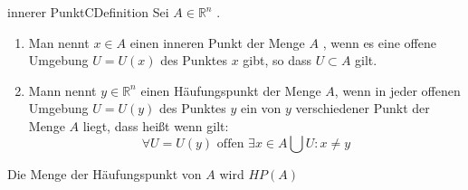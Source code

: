 \documentclass[11.5 pt, a4paper]{memoir}
\begin{document}
\begin{ibox}{innerer Punkt}{CDefinition}
   Sei $ A \in \mathbb{R}^n $ .
   \begin{enumerate}[label=\alph*)]
   	\item Man nennt $ x \in A $ einen inneren Punkt der Menge $ A $ , wenn es eine offene Umgebung $ U = U(x) $ des Punktes $ x $ gibt,
		so dass $ U \subset A $ gilt.
    \item Mann nennt $ y \in \mathbb{R}^n $ einen Häufungspunkt der Menge $ A $, wenn in jeder offenen Umgebung $ U = U(y) $ des
		Punktes $ y $ ein von $ y $ verschiedener Punkt der Menge $ A $ liegt, dass heißt wenn gilt:
		$$ \forall U = U(y) \text{ offen } \exists x \in A \bigcup U : x \neq y $$
		
   \end{enumerate}
  Die Menge der Häufungspunkt von $ A $ wird $ HP(A) $ 
\end{ibox}
\end{document}
